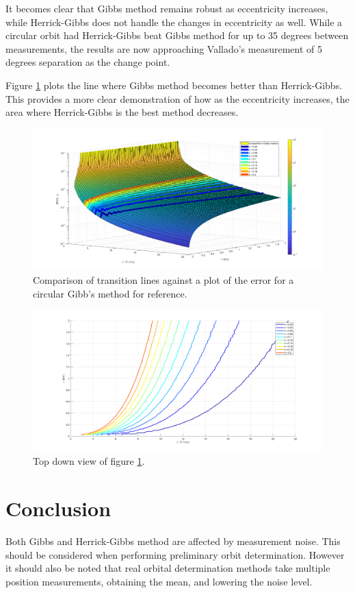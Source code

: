 \documentclass[12pt]{article}
\begin{document}
It becomes clear that Gibbs method remains robust as eccentricity increases, while Herrick-Gibbs does not handle the changes in eccentricity as well. While a circular orbit had Herrick-Gibbs beat Gibbs method for up to 35 degrees between measurements, the results are now approaching Vallado's measurement of 5 degrees separation as the change point.\par 

Figure \ref{fig:eccecomp} plots the line where Gibbs method becomes better than Herrick-Gibbs. This provides a more clear demonstration of how as the eccentricity increases, the area where Herrick-Gibbs is the best method decreases. 
\begin{figure}[H]
	\centering
	\includegraphics[width=0.7\linewidth]{ecceComp_3}
	\caption{Comparison of transition lines against a plot of the error for a circular Gibb's method for reference.}
	\label{fig:eccecomp}
\end{figure}

\begin{figure}[H]
	\centering
	\includegraphics[width=0.7\linewidth]{topDownEcce_Comp_3}
	\caption{Top down view of figure \ref{fig:eccecomp}.}
	\label{fig:topdowneccecomp3}
\end{figure}





	
	\section{Conclusion}
	Both Gibbs and Herrick-Gibbs method are affected by measurement noise. This should be considered when performing preliminary orbit determination. However it should also be noted that real orbital determination methods take multiple position measurements, obtaining the mean, and lowering the noise level. \par 
	
\end{document}
